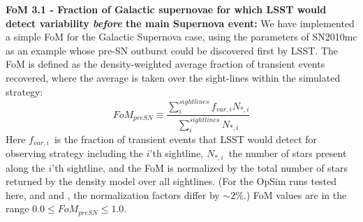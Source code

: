 


{\bf FoM 3.1 - Fraction of Galactic supernovae for which LSST would
  detect variability {\it before} the main Supernova event:} We have
implemented a simple FoM for the Galactic Supernova case, using the
parameters of SN2010mc as an example whose pre-SN outburst could be
discovered first by LSST. The FoM is defined as the density-weighted
average fraction of transient events recovered, where the average is
taken over the sight-lines within the simulated strategy:
\begin{equation}
  FoM_{preSN} \equiv \frac{ \sum^{sightlines}_{i} f_{var, i} N_{\ast, i} } {\sum^{sightlines}_{i} N_{\ast, i}}
\label{eqn:def_FOM_3p1}
\end{equation}
Here $f_{var, i}$~is the fraction of transient events that
LSST would detect for observing strategy including the $i$'th
sightline, $N_{\ast,i}$~the number of stars present along the $i$'th
sightline, and the FoM is normalized by the total number of stars
returned by the density model over all sightlines. (For the OpSim
runs tested here,  and
 and , the normalization factors differ by $\sim
2\%$.) FoM values are in the range $0.0 \le FoM_{preSN} \le 1.0$.

